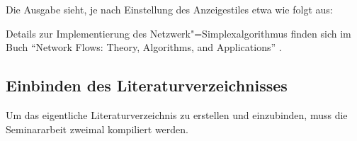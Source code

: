 Die Ausgabe sieht, je nach Einstellung des Anzeigestiles etwa wie folgt aus:

Details zur Implementierung des Netzwerk"=Simplexalgorithmus finden sich im Buch "`Network Flows: Theory, Algorithms, and Applications"'  \cite{ahuja:93}.

\subsection*{Einbinden des Literaturverzeichnisses}

Um das eigentliche Literaturverzeichnis zu erstellen und einzubinden, muss die Seminararbeit zweimal kompiliert werden.
